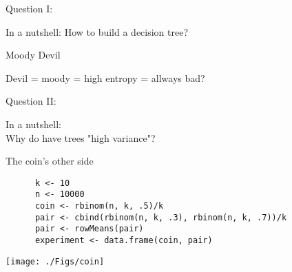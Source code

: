 \documentclass[12pt,t]{beamer}
\begin{document}
{\begin{frame}[c]{Question I:}
\begin{center}
  \Large \textcolor{lolit}{In a nutshell:} How to build a decision tree?
\end{center}
\end{frame}

\begin{frame}[c]{Moody Devil}
  \begin{center}
    Devil = moody
     = 
    high entropy 
     = 
    allways bad?\\
  \end{center}
\end{frame}

\begin{frame}[c]{Question II:}
\begin{center}
  \Large \textcolor{lolit}{In a nutshell:}\\ Why do have trees "high variance"?
\end{center}
\end{frame}

\begin{frame}[fragile]{The coin's other side}
  \begin{center}
  \end{center}
\end{frame}

\begin{frame}[fragile]
  \begin{center}
  \begin{minipage}{\textwidth}
    \begin{lstlisting}
      k <- 10
      n <- 10000
      coin <- rbinom(n, k, .5)/k
      pair <- cbind(rbinom(n, k, .3), rbinom(n, k, .7))/k
      pair <- rowMeans(pair)
      experiment <- data.frame(coin, pair)
     \end{lstlisting}
   \end{minipage}
   \texttt{[image: ./Figs/coin]}
   \end{center}
\end{frame}

}
\end{document}
